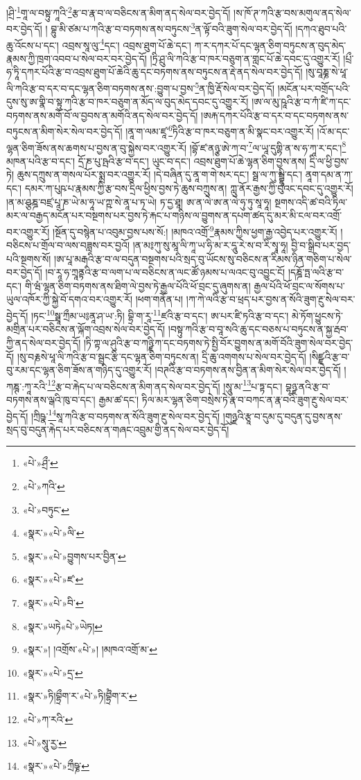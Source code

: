 །ཤྲི་\footnote{«པེ་»ཤྲྀ་}གཱ་ལ་བསྟུ་ཀཱའི་\footnote{«པེ་»ཀའི་}རྩ་བ་རྣ་བ་ལ་བཅིངས་ན་མིག་ནད་སེལ་བར་བྱེད་དོ། །ས་ཁོ་ཊ་ཀའི་རྩ་བས་མགུལ་ནད་སེལ་བར་བྱེད་དོ། །
བྷུ་མི་ཙམ་པ་ཀའི་རྩ་བ་བཏགས་ནས་བཏུངས་\footnote{«པེ་»བཏུང་}ན་ལྟོ་བའི་ཟུག་སེལ་བར་བྱེད་དོ། །དཀའ་ཐུབ་པའི་ཆུ་འོངས་པ་དང་། འབྲས་སཱ་ལུ་\footnote{«སྣར་»«པེ་»ལི་}དང་། འབྲས་ཐུག་པོ་ཆེ་དང་། ཀ་ར་དཀར་པོ་དང་ལྷན་ཅིག་བཏུངས་ན་བུད་མེད་རྣམས་ཀྱི་ཁྲག་འབབ་པ་སེལ་བར་བར་བྱེད་དོ། །ཏྲི་ཤྲུ་ལི་ཀའི་རྩ་བ་ཁར་བཅུག་ན་གླང་པོ་ཆེ་དབང་དུ་འགྱུར་རོ། །པྲྀ་ཧ་ཏཱི་དཀར་པོའི་རྩ་བ་འབྲས་ཐུག་པོ་ཆེའི་ཆུ་དང་བཏགས་ནས་བཏུངས་ན་རྡེ་ནད་སེལ་བར་བྱེད་དོ། །སུ་བཱཎྞ་སེ་ཕཱ་ལི་ཀའི་རྩ་བ་དར་བ་དང་ལྷན་ཅིག་བཏགས་ནས་:བྱུག་པ་བྱས་\footnote{«སྣར་»«པེ་»བྱུགས་པར་བྱིན་}ན་ཁྱི་རྡོ་སེལ་བར་བྱེད་དོ། །མངོན་པར་བགྲོད་པའི་དུས་སུ་ཨ་གྣི་བ་སྟུ་ཀའི་རྩ་བ་ཁར་བཅུག་ན་མོད་ལ་བུད་མེད་དབང་དུ་འགྱུར་རོ། །ཨ་ལ་མུ་ཥཱའི་རྩ་བ་ཀཾ་ཛི་ཀ་དང་བཏགས་ནས་མགོ་བོ་ལ་བྱབས་ན་མགོའི་ནད་སེལ་བར་བྱེད་དོ། །ཨརྐ་དཀར་པོའི་རྩ་བ་དར་བ་དང་བཏགས་ནས་བཏུངས་ན་མིག་སེར་སེལ་བར་བྱེད་དོ། །ནཱ་ག་ལམ་ཛཱ་\footnote{«སྣར་»«པེ་»ཛ་}ཏིའི་རྩ་བ་ཁར་བཅུག་ན་མི་སྣང་བར་འགྱུར་རོ། །འོ་མ་དང་ལྷན་ཅིག་ཟོས་ནས་ཆགས་པ་བྱས་ན་བུ་སྐྱེས་བར་འགྱུར་རོ། །བྷོ་ཛ་ནཉྩ་ཨེ་ཀ་བ་\footnote{«སྣར་»«པེ་»བི་}ལ་ཡཱ་དུགྷི་ན་ས་ཧ་ཀཱ་ར་དང་།\footnote{«སྣར་»ཡཏེ«པེ་»ཡེཏ།} མཁན་པའི་རྩ་བ་དང་། དྲོ་ཎ་པུ་ཥྤའི་རྩ་བ་དང་། ཡུང་བ་དང་། འབྲས་ཐུག་པོ་ཆེ་ལྷན་ཅིག་བྱས་ནས། དྲི་ལ་ཕྱི་བྱས་ཏེ། ཆུས་དཀྲུས་ན་གསལ་པོར་སྨྲ་བར་འགྱུར་རོ། །དེ་བཞིན་དུ་ནཱ་ག་གེ་སར་དང་། སྠ་ལ་ཀུ་མྦྷཱི་དང་། ནཱག་དམ་ན་ཀ་དང་། དམར་ཀ་པུཥ་པ་རྣམས་ཀྱི་རྩ་བས་དྲིལ་ཕྱིས་བྱས་ཏེ་ཆུས་བཀྲུས་ན། ཀླུ་ནོར་རྒྱས་ཀྱི་བུའང་དབང་དུ་འགྱུར་རོ། །ན་མ་ཤྩཎྜ་བཛྲ་པཱ་ཎ་ཡེ་མ་ཧཱ་ཡ་ཀྵ་སེ་ནཱ་པ་ཏ་ཡེ། ཏ་དྱ་ཐཱ། ཨ་ན་ལེ་ཨ་ན་ལེ་ཧུ་ཏུ་སཱ་ཧཱ། སྔགས་འདི་ཚ་བའི་ཏིལ་མར་ལ་བརྒྱད་མངོན་པར་བསྔགས་པར་བྱས་ཏེ་རྐང་པ་གཉིས་ལ་བྱུགས་ན་དཔག་ཚད་དུ་མར་མི་ངལ་བར་འགྲོ་བར་འགྱུར་རོ། །སྔོན་དུ་བསྙེན་པ་འབུམ་བྱས་པས་སོ:། །མཁའ་འགྲོ་\footnote{«སྣར་»། །འགྲོས་«པེ་»། །མཁའ་འགྲོ་མ་}རྣམས་ཀྱིས་ཕྱག་རྒྱ་འབྱེད་པར་འགྱུར་རོ། །བཅིངས་པ་གྲོལ་བ་ལས་བཟླས་བར་བྱའོ། །ན་མ༔ཀུ་སུ་མཱ་ལི་ཀཱ་ཡ་ཧི་མ་ར་དཱུ་རེ་ས་བ་རི་སྭཱ་ཧཱ། བྱི་བ་སྒྲིབ་པར་བྱད་པའི་སྔགས་སོ། །ཨ་པཱ་མརྒའི་རྩ་བ་ལ་བདུན་བསྔགས་པའི་སྲད་བུ་ཡོངས་སུ་བཅིངས་ན་རིམས་ཉིན་གཅིག་པ་སེལ་བར་བྱེད་དོ། །བ་རཱ་ཧ་ཀྲཱནྟའི་རྩ་བ་ལག་པ་ལ་བཅིངས་ན་ལང་ཚོ་ཉམས་པ་ལའང་བུ་འབྱུང་ངོ། །དཎྜོ་ཏྤ་ལའི་རྩ་བ་དང་། གི་ཝཾ་ལྷན་ཅིག་བཏགས་ནས་ཐིག་ལེ་བྱས་ཏེ་རྒྱལ་པོའི་ཕོ་བྲང་དུ་ཞུགས་ན། རྒྱལ་པོའི་ཕོ་བྲང་ལ་སོགས་པ་ཡུལ་འཁོར་ཀྱི་སྐྱེ་བོ་དགའ་བར་འགྱུར་རོ། །ཕག་གནོན་པ། །ཀ་ཀེ་ལའི་རྩ་བ་ཕྲད་པར་བྱས་ན་སོའི་ཟུག་རྔུ་སེལ་བར་བྱེད་དོ། །ཏང་\footnote{«སྣར་»«པེ་»དྲ་}སྠཱ་ཀྲྀམ་ཡ༔ནཱ་ཤ་ཡ་:ཏི། བྷྲི་ག་རཱ་\footnote{«སྣར་»ཏི།བྷྲྀག་ར་«པེ་»ཏི།བྷྲྀཾག་ར་}ཛའི་རྩ་བ་དང་། ཨ་པར་ཛི་ཏའི་རྩ་བ་དང་། མེ་ཏོག་ཕྱུངས་ཏེ་མགྲིན་པར་བཅིངས་ན་ལྐོག་འབྲས་སེལ་བར་བྱེད་དོ། །བསྟུ་ཀའི་རྩ་བ་བཱ་སའི་ཆུ་དང་བཅས་པ་བཏུངས་ན་སྐྱ་རྦབ་ཀྱི་ནད་སེལ་བར་བྱེད་དོ། །ཏི་ཀྟ་ལ་ཤུའི་རྩ་བ་ཀཉྫི་ཀ་དང་བཏགས་ཏེ་སྤྱི་བོར་བྱུགས་ན་མགོ་བོའི་ཟུག་སེལ་བར་བྱེད་དོ། །སུ་བརྞསེ་ཕཱ་ལི་ཀའི་རྩ་བ་སྦྲང་རྩི་དང་ལྷན་ཅིག་བཏུངས་ན། དྲི་ཆུ་འགགས་པ་སེལ་བར་བྱེད་དོ། །སིཛྫའི་རྩ་བ་བུ་རམ་དང་ལྷན་ཅིག་ཟོས་ན་གཉིད་དུ་འགྱུར་རོ། །བཊའི་རྩ་བ་བཏགས་ནས་བྱིན་ན་མིག་སེར་སེལ་བར་བྱེད་དོ། །ཀཎྚ་:ཀཱ་རའི་\footnote{«པེ་»ཀ་རའི་}རྩ་བ་རྐེད་པ་ལ་བཅིངས་ན་མིག་ནད་སེལ་བར་བྱེད་དོ། །སཱུ་མ་\footnote{«པེ་»སཱུ་རྱ་}པ་ཏྟ་དང་། བྷཉྫ་ནའི་རྩ་བ་བཏགས་ནས་ལྒའི་ཁུ་བ་དང་། རྒྱམ་ཚ་དང་། ཏིལ་མར་ལྷན་ཅིག་བསྲེས་ཏེ་རྣ་བ་བཀང་ན་རྣ་བའི་ཟུག་རྔུ་སེལ་བར་བྱེད་དོ། །ཀྲིཥྣ་\footnote{«སྣར་»«པེ་»ཀྲྀཥྞ་}སཱ་ཀའི་རྩ་བ་བཏགས་ན་སོའི་ཟུག་རྔུ་སེལ་བར་བྱེད་དོ། །གུཉྫའི་རྩཱ་བ་དུམ་དུ་བདུན་དུ་བྱས་ནས་སྲད་བུ་བདུན་རྐེད་པར་བཅིངས་ན་གཞང་འབྲུམ་གྱི་ནད་སེལ་བར་བྱེད་དོ། 